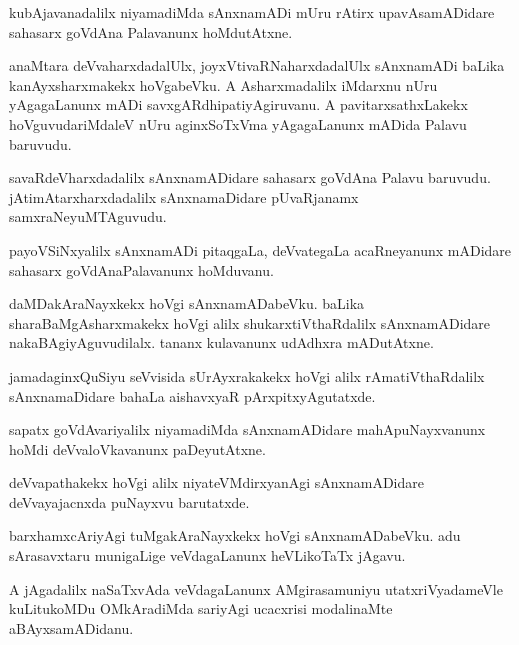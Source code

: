 \documentclass{article}
\begin{document}
\begin{mn}
kubAjavanadalilx niyamadiMda sAnxnamADi mUru rAtirx upavAsamADidare sahasarx goVdAna Palavanunx 
hoMdutAtxne.
\end{mn}

\begin{mn}
anaMtara deVvaharxdadalUlx, joyxVtivaRNaharxdadalUlx sAnxnamADi baLika kanAyxsharxmakekx 
hoVgabeVku. A Asharxmadalilx iMdarxnu nUru yAgagaLanunx mADi savxgARdhipatiyAgiruvanu. A 
pavitarxsathxLakekx hoVguvudariMdaleV nUru aginxSoTxVma yAgagaLanunx mADida Palavu baruvudu.
\end{mn}

\begin{mn}
savaRdeVharxdadalilx sAnxnamADidare sahasarx goVdAna Palavu baruvudu. jAtimAtarxharxdadalilx 
sAnxnamaDidare pUvaRjanamx samxraNeyuMTAguvudu.
\end{mn}

\begin{mn}
payoVSiNxyalilx sAnxnamADi pitaqgaLa, deVvategaLa acaRneyanunx mADidare sahasarx goVdAnaPalavanunx 
hoMduvanu.
\end{mn}

\begin{mn}
daMDakAraNayxkekx hoVgi sAnxnamADabeVku. baLika sharaBaMgAsharxmakekx hoVgi alilx 
shukarxtiVthaRdalilx sAnxnamADidare nakaBAgiyAguvudilalx. tananx kulavanunx udAdhxra mADutAtxne.
\end{mn}

\begin{mn}
jamadaginxQuSiyu seVvisida sUrAyxrakakekx hoVgi alilx rAmatiVthaRdalilx sAnxnamaDidare bahaLa 
aishavxyaR pArxpitxyAgutatxde.
\end{mn}

\begin{mn}
sapatx goVdAvariyalilx niyamadiMda sAnxnamADidare mahApuNayxvanunx hoMdi deVvaloVkavanunx 
paDeyutAtxne.
\end{mn}

\begin{mn}
deVvapathakekx hoVgi alilx niyateVMdirxyanAgi sAnxnamADidare deVvayajacnxda puNayxvu barutatxde.
\end{mn}

\begin{mn}
barxhamxcAriyAgi tuMgakAraNayxkekx hoVgi sAnxnamADabeVku. adu sArasavxtaru munigaLige 
veVdagaLanunx heVLikoTaTx jAgavu.
\end{mn}

\begin{mn}
A jAgadalilx naSaTxvAda veVdagaLanunx AMgirasamuniyu utatxriVyadameVle kuLitukoMDu OMkAradiMda 
sariyAgi ucacxrisi modalinaMte aBAyxsamADidanu.
\end{mn}
\end{document}
